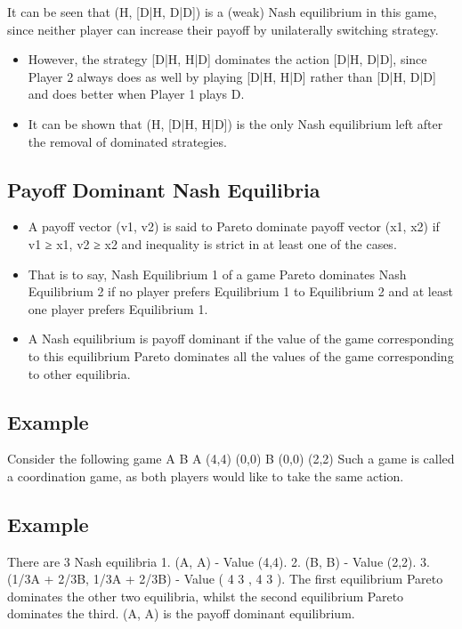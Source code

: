 \documentclass[]{report}
\begin{document}
It can be seen that (H, [D|H, D|D]) is a (weak) Nash equilibrium
in this game, since neither player can increase their payoff by
unilaterally switching strategy.

\begin{itemize}
	\item However, the strategy [D|H, H|D] dominates the action
	[D|H, D|D], since Player 2 always does as well by playing
	[D|H, H|D] rather than [D|H, D|D] and does better when Player 1
	plays D.
	\item 	It can be shown that (H, [D|H, H|D]) is the only Nash equilibrium
	left after the removal of dominated strategies.
\end{itemize}

\subsection{Payoff Dominant Nash Equilibria}
\begin{itemize}
	\item A payoff vector (v1, v2) is said to Pareto dominate payoff vector
	(x1, x2) if v1 ≥ x1, v2 ≥ x2 and inequality is strict in at least one of
	the cases.
	\item	That is to say, Nash Equilibrium 1 of a game Pareto dominates
	Nash Equilibrium 2 if no player prefers Equilibrium 1 to Equilibrium
	2 and at least one player prefers Equilibrium 1.
	\item	A Nash equilibrium is payoff dominant if the value of the game
	corresponding to this equilibrium Pareto dominates all the values
	of the game corresponding to other equilibria.
\end{itemize}

\subsection{Example}
Consider the following game
A B
A (4,4) (0,0)
B (0,0) (2,2)
Such a game is called a coordination game, as both players would
like to take the same action.
\subsection{Example}
There are 3 Nash equilibria
1. (A, A) - Value (4,4).
2. (B, B) - Value (2,2).
3. (1/3A + 2/3B, 1/3A + 2/3B) - Value ( 4
3
,
4
3
).
The first equilibrium Pareto dominates the other two equilibria,
whilst the second equilibrium Pareto dominates the third.
(A, A) is the payoff dominant equilibrium.
\end{document}
